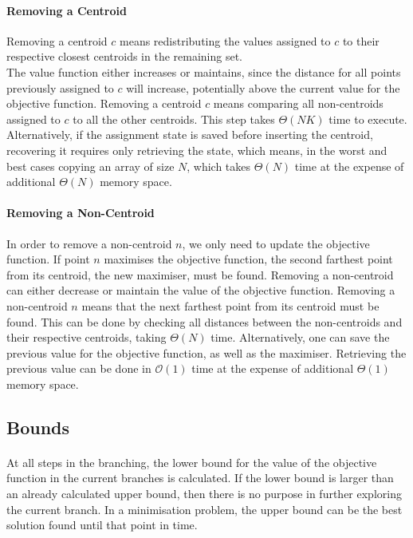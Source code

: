 \paragraph{Removing a Centroid}
Removing a centroid $c$ means redistributing the values assigned to $c$ to their respective closest centroids in the remaining set. \\
The value function either increases or maintains, since the distance for all points previously assigned to $c$ will increase, potentially above the current value for the objective function.
Removing a centroid $c$ means comparing all non-centroids assigned to $c$ to all the other centroids. This step takes $\Theta(NK)$ time to execute. Alternatively, if the assignment state is saved before inserting the centroid, recovering it requires only retrieving the state, which means, in the worst and best cases copying an array of size $N$, which takes $\Theta(N)$ time at the expense of additional $\Theta(N)$ memory space.

\paragraph{Removing a Non-Centroid}
In order to remove a non-centroid $n$, we only need to update the objective function. If point $n$ maximises the objective function, the second farthest point from its centroid, the new maximiser, must be found.
Removing a non-centroid can either decrease or maintain the value of the objective function.
Removing a non-centroid $n$ means that the next farthest point from its centroid must be found. This can be done by checking all distances between the non-centroids and their respective centroids, taking $\Theta(N)$ time. Alternatively, one can save the previous value for the objective function, as well as the maximiser. Retrieving the previous value can be done in $\mathcal{O}(1)$ time at the expense of additional $\Theta(1)$ memory space.
\subsection{Bounds}
\label{sec:bounds}
\paragraph{}
At all steps in the branching, the lower bound for the value of the objective function in the current branches is calculated. If the lower bound is larger than an already calculated upper bound, then there is no purpose in further exploring the current branch. In a minimisation problem, the upper bound can be the best solution found until that point in time.

